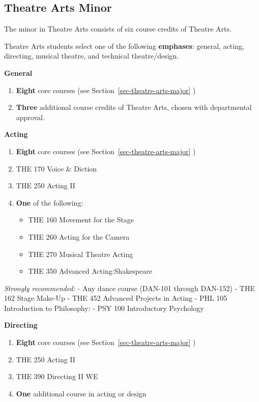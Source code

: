 \documentclass[
  letterpaper,
]{scrbook}
\providecommand{\tightlist}{%
  \setlength{\itemsep}{0pt}\setlength{\parskip}{0pt}}
\begin{document}
\subsection{Theatre Arts Minor}\label{theatre-arts-minor}

The minor in Theatre Arts consists of six course credits of Theatre
Arts.

Theatre Arts students select one of the following \textbf{emphases}:
general, acting, directing, musical theatre, and technical
theatre/design.

\textbf{General}

\begin{enumerate}
\def\labelenumi{\arabic{enumi}.}
\item
  \textbf{Eight} core courses (see Section~\ref{sec-theatre-arts-major}
  )
\item
  \textbf{Three} additional course credits of Theatre Arts, chosen with
  departmental approval.
\end{enumerate}

\textbf{Acting}

\begin{enumerate}
\def\labelenumi{\arabic{enumi}.}
\item
  \textbf{Eight} core courses (see Section~\ref{sec-theatre-arts-major}
  )
\item
  THE 170 Voice \& Diction
\item
  THE 250 Acting II
\item
  \textbf{One} of the following:

  \begin{itemize}
  \tightlist
  \item
    THE 160 Movement for the Stage
  \item
    THE 260 Acting for the Camera
  \item
    THE 270 Musical Theatre Acting
  \item
    THE 350 Advanced Acting:Shakespeare
  \end{itemize}
\end{enumerate}

\emph{Strongly recommended:} - Any dance course (DAN-101 through
DAN-152) - THE 162 Stage Make-Up - THE 452 Advanced Projects in Acting -
PHL 105 Introduction to Philosophy: - PSY 100 Introductory Psychology

\textbf{Directing}

\begin{enumerate}
\def\labelenumi{\arabic{enumi}.}
\item
  \textbf{Eight} core courses (see Section~\ref{sec-theatre-arts-major}
  )
\item
  THE 250 Acting II
\item
  THE 390 Directing II WE
\item
  \textbf{One} additional course in acting or design
\end{enumerate}
\end{document}
